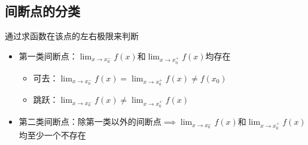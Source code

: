 \documentclass[12pt, a4paper, oneside, UTF8]{ctexbook}
\begin{document}
\begin{sloppypar}
    \subsection{间断点的分类}
    通过求函数在该点的左右极限来判断
    \begin{itemize}
        \item 第一类间断点：$\lim _ { x \rightarrow x _ { 0 } ^{-}} f ( x )$​ 和$\lim _ { x \rightarrow x _ { 0 }^ {+}} f ( x )$​ 均存在
              \begin{itemize}
                  \item 可去：$\lim _ { x \rightarrow x_0 ^ { - } } f ( x ) = \lim _ { x \rightarrow x_0^{+} } f  ( x ) \neq f(x_0)$
                  \item 跳跃：$\lim _ { x \rightarrow x_0^{-} } f ( x ) \not= \lim _ { x \rightarrow x_0^{+} } f ( x )$
              \end{itemize}
        \item 第二类间断点：除第一类以外的间断点$\implies \lim _ { x \rightarrow x _ { 0 } ^{-}} f ( x )$和$\lim _ { x \rightarrow x _ { 0 }^ {+}} f ( x )$​ 均至少一个不存在
    \end{itemize}
    \ifx\allfiles\undefined
\end{sloppypar}
\end{document}

